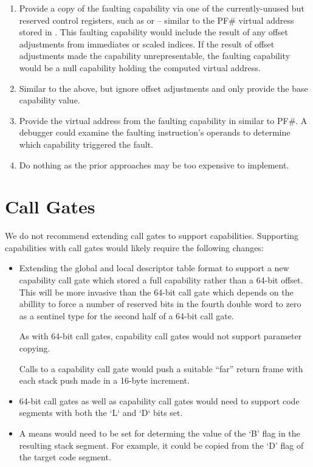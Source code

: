 \begin{enumerate}
\item Provide a copy of the faulting capability via one of the
  currently-unused but reserved control registers, such as \CRFIVE{}
  or \CRTWELVE{} -- similar to the PF\# virtual address stored in
  \CRTWO{}.  This faulting capability would include the result of any
  offset adjustments from immediates or scaled indices.  If the result
  of offset adjustments made the capability unrepresentable, the
  faulting capability would be a null capability holding the computed
  virtual address.
\item Similar to the above, but ignore offset adjustments and only
  provide the base capability value.
\item Provide the virtual address from the faulting capability in
  \CRTWO{} similar to PF\#.  A debugger could examine the faulting
  instruction's operands to determine which capability triggered the fault.
\item Do nothing as the prior approaches may be too expensive to
  implement.
\end{enumerate}

\section{Call Gates}

We do not recommend extending call gates to support capabilities.
Supporting capabilities with call gates would likely require the
following changes:

\begin{itemize}
  \item Extending the global and local descriptor table format to
    support a new capability call gate which stored a full capability
    rather than a 64-bit offset.  This will be more invasive than the
    64-bit call gate which depends on the abillity to force a number
    of reserved bits in the fourth double word to zero as a sentinel
    type for the second half of a 64-bit call gate.

    As with 64-bit call gates, capability call gates would not support
    parameter copying.

    Calls to a capability call gate would push a suitable ``far''
    return frame with each stack push made in a 16-byte increment.

  \item 64-bit call gates as well as capability call gates would need
    to support code segments with both the `L` and `D` bits set.

  \item A means would need to be set for determing the value of the
    `B' flag in the resulting stack segment.  For example, it could be
    copied from the `D' flag of the target code segment.
\end{itemize}

